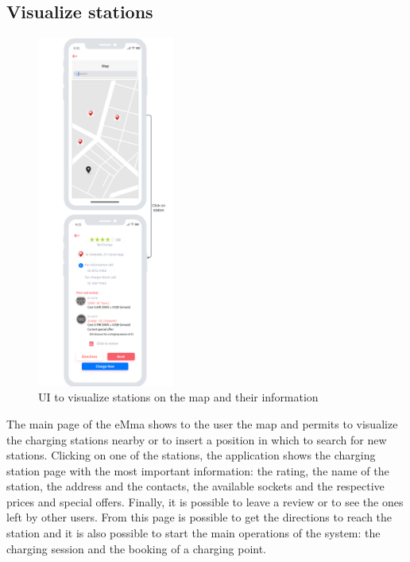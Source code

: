 \subsection{Visualize stations}
\begin{figure}[H]
    \centering
    \includegraphics[width=0.4\textwidth]{Images/cp3/visualizeStations.png}
    \caption{UI to visualize stations on the map and their information}
\end{figure}
The main page of the eMma shows to the user the map and permits to visualize the charging stations nearby or to insert a position in which to search for new stations. Clicking on one of the stations, the application shows the charging station page with the most important information: the rating, the name of the station, the address and the contacts, the available sockets and the respective prices and special offers. Finally, it is possible to leave a review or to see the ones left by other users. From this page is possible to get the directions to reach the station and it is also possible to start the main operations of the system: the charging session and the booking of a charging point.

